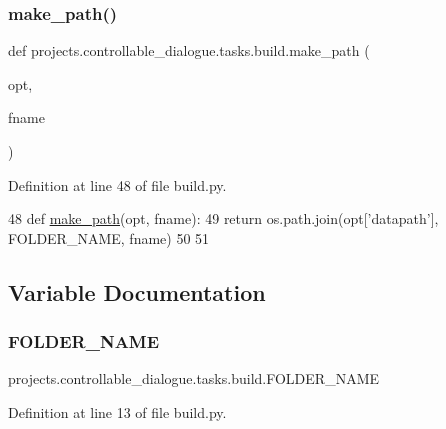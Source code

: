 \subsubsection{\texorpdfstring{make\+\_\+path()}{make\_path()}}
{\footnotesize\ttfamily def projects.\+controllable\+\_\+dialogue.\+tasks.\+build.\+make\+\_\+path (\begin{DoxyParamCaption}\item[{}]{opt,  }\item[{}]{fname }\end{DoxyParamCaption})}



Definition at line 48 of file build.\+py.


\begin{DoxyCode}
48 \textcolor{keyword}{def }\hyperlink{namespaceprojects_1_1controllable__dialogue_1_1tasks_1_1build_a4ad8db760a5f21fd2efa3e09b47a0ec9}{make\_path}(opt, fname):
49     \textcolor{keywordflow}{return} os.path.join(opt[\textcolor{stringliteral}{'datapath'}], FOLDER\_NAME, fname)
50 
51 
\end{DoxyCode}


\subsection{Variable Documentation}
\mbox{\label{namespaceprojects_1_1controllable__dialogue_1_1tasks_1_1build_a30f40f900104e4d15e8f5bae96e3d2de}} 
\subsubsection{\texorpdfstring{F\+O\+L\+D\+E\+R\+\_\+\+N\+A\+ME}{FOLDER\_NAME}}
{\footnotesize\ttfamily projects.\+controllable\+\_\+dialogue.\+tasks.\+build.\+F\+O\+L\+D\+E\+R\+\_\+\+N\+A\+ME}



Definition at line 13 of file build.\+py.

\mbox{\label{namespaceprojects_1_1controllable__dialogue_1_1tasks_1_1build_aff2d50a83bc83a9f5f82bca82737fec2}} 
